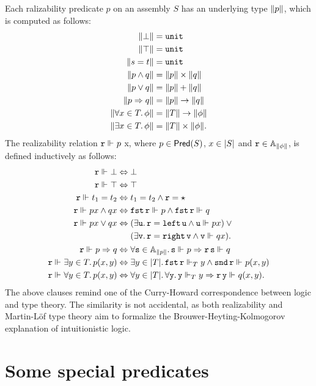Each ralizability predicate $p$ on an assembly $S$ has an underlying type $\T{p}$, which is computed as follows:
%
\begin{align*}
  \T{\bot} &= \unit \\
  \T{\top} &= \unit \\
  \T{s = t} &= \unit \\
  \T{p \land q} &= \T{p} \times \T{q}\\
  \T{p \lor q} &= \T{p} + \T{q}\\
  \T{p \lthen q} &= \T{p} \to \T{q}\\
  \T{\all{x \in T}{\phi}} &= \T{T} \to \T{\phi} \\
  \T{\some{x \in T}{\phi}} &= \T{T} \times \T{\phi}.
\end{align*}
%
The realizability relation $\R{r} \rz p$ x, where $p \in \Pred{S}$, $x \in \S{S}$ and $\R{r} \in \Atyp{\T{\phi}}$, is defined inductively as follows:
%
\begin{align*}
  \R{r} \rz \bot &\liff \bot\\
  \R{r} \rz \top &\liff \top\\
  \R{r} \rz t_1 = t_2 &\liff t_1 = t_2 \land \R{r} = \star\\
  \R{r} \rz p x \land q x &\liff
  \combFst\,\R{r} \rz p \land \combFst\,\R{r} \rz q\\
  \R{r} \rz p x \lor q x
    &\liff
    \begin{aligned}[t]
      & (\some{\R{u}} \R{r} = \combLeft\,\R{u} \land \R{u} \rz p x)
      \lor {} \\
      &(\some{\R{v}} \R{r} = \combRight\,\R{v} \land \R{v} \rz q x).
    \end{aligned}
  \\
  \R{r} \rz p \lthen q &\liff
  \all{\R{s} \in \Atyp{\T{p}}} \R{s} \rz p \lthen \R{r}\,\R{s} \rz q
  \\
  \R{r} \rz \some{y \in T} p(x,y) &\liff
  \some{y \in \S{T}} \combFst\,\R{r} \rz[T] y \land \combSnd\,\R{r} \rz p(x,y)
  \\
  \R{r} \rz \all{y \in T} p(x, y) &\liff
    \all{y \in \S{T}} \all{\R{y}}
     \R{y} \rz[T] y \lthen \R{r}\,\R{y} \rz q(x,y).
\end{align*}
%
The above clauses remind one of the Curry-Howard correspondence between logic and type theory. The similarity is not accidental, as both realizability and Martin-Löf type theory aim to formalize the Brouwer-Heyting-Kolmogorov explanation of intuitionistic logic.


\section{Some special predicates}
\label{sec:special-predicates}



